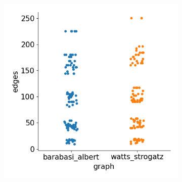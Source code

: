 \begin{figure}[H]
\begin{subfigure}{0.4\textwidth}
        \includegraphics[width=\linewidth]{images/results/random/tanh/graph_edges.png}
        \caption{} \label{fig:tanh_graph_edges}
    \end{subfigure}%
  

\end{figure}
